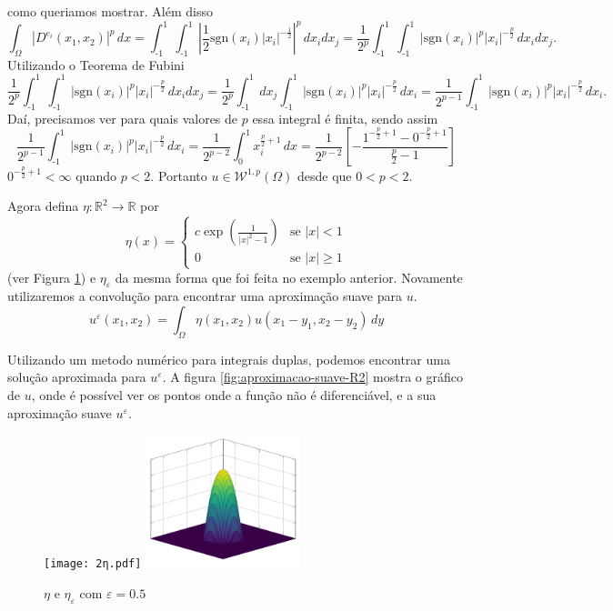 \documentclass[a4paper, 11pt]{book}
\theoremstyle{definition}
\newcommand{\bR}{\mathbb{R}}
\newcommand{\cW}{\mathcal{W}}
\newcommand{\sgn}{\mathrm{sgn}}
\begin{document}
\begin{ex}
\[    \]
    como queriamos mostrar.
    Além disso
    \[
        \int_\Omega |D^{e_i} (x_1,x_2)|^p \, dx = \int_{\text{-}1}^1 \int_{\text{-}1}^1 \left| \frac{1}{2} \sgn(x_i) |x_i|^{-\frac{1}{2}} \right|^p \, dx_i dx_j = \frac{1}{2^p}\int_{\text{-}1}^1 \int_{\text{-}1}^1 |\sgn(x_i)|^p |x_i|^{-\frac{p}{2}} \,dx_i dx_j.
    \]
    Utilizando o Teorema de Fubini
    {\small
    \[
        \frac{1}{2^p}\int_{\text{-}1}^1\int_{\text{-}1}^1 |\sgn(x_i)|^p |x_i|^{-\frac{p}{2}} \,dx_i dx_j = \frac{1}{2^p}\int_{\text{-}1}^1 dx_j \int_{\text{-}1}^1 |\sgn(x_i)|^p |x_i|^{-\frac{p}{2}} \,dx_i = \frac{1}{2^{p-1}} \int_{\text{-}1}^1 |\sgn(x_i)|^p |x_i|^{-\frac{p}{2}} \,dx_i.
    \]}
    Daí, precisamos ver para quais valores de $p$ essa integral é finita, sendo assim
    \[
        \frac{1}{2^{p-1}} \int_{\text{-}1}^1 |\sgn(x_i)|^p |x_i|^{-\frac{p}{2}} \,dx_i = \frac{1}{2^{p-2}}\int_0^1 x_i^{\frac{p}{2}+1} \,dx = \frac{1}{2^{p-2}} \left[ -\frac{1^{-\frac{p}{2}+1} - 0^{-\frac{p}{2}+1}}{\tfrac{p}{2} - 1} \right]
    \]
    $0^{-\frac{p}{2} + 1} < \infty$ quando $p < 2$. Portanto $u \in \cW^{1,p}(\Omega)$ desde que $0 < p < 2$.

    Agora defina $\eta: \bR^2 \to \bR$ por
    \[
        \eta(x) = 
        \left\{ 
            \begin{array}{lr}
                c \exp\left(\frac{1}{|x|^2 - 1} \right) & \text{se } |x| < 1\\
                0 & \text{se } |x| \geqslant 1
            \end{array}
        \right.
    \]
    (ver Figura \ref{fig:eta-R2}) e $\eta_\varepsilon$ da mesma forma que foi feita no exemplo anterior. Novamente utilizaremos a convolução para encontrar uma aproximação suave para $u$.
    \[
        u^{\varepsilon}(x_1,x_2) = \int_\Omega \eta(x_1,x_2) u(x_1 - y_1, x_2 - y_2) \,dy
    \]

    Utilizando um metodo numérico para integrais duplas, podemos encontrar uma solução aproximada para $u^\varepsilon$.
    A figura \ref{fig:aproximacao-suave-R2} mostra o gráfico de $u$, onde é possível ver os pontos onde a função não é diferenciável, e a sua aproximação suave $u^\varepsilon$.

    \begin{figure}
        \centering
        \texttt{[image: 2η.pdf]}
        \hspace{10mm}
        \includegraphics[width=0.4\textwidth]{2ηε.pdf}
        \caption{$\eta$ e $\eta_\varepsilon$ com $\varepsilon = 0.5$}
        \label{fig:eta-R2}
    \end{figure}


\end{ex}
\end{document}
